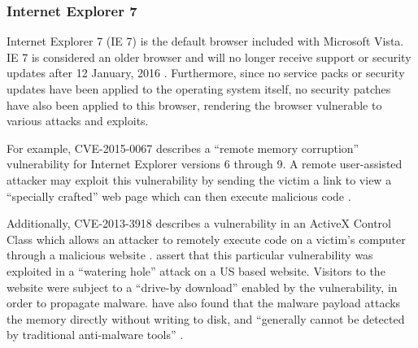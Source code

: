 
\subsubsection{Internet Explorer 7}

Internet Explorer 7 (IE 7) is the default browser included with Microsoft Vista. IE 7 is considered an older browser and will no longer receive support or security updates after 12 January, 2016 \citep{Capriotti2014}. Furthermore, since no service packs or security updates have been applied to the operating system itself, no security patches have also been applied to this browser, rendering the browser vulnerable to various attacks and exploits.

For example, CVE-2015-0067 describes a ``remote memory corruption'' vulnerability for Internet Explorer versions 6 through 9. A remote user-assisted attacker may exploit this vulnerability by sending the victim a link to view a ``specially crafted'' web page which can then execute malicious code \citep{SecurityFocus2015}.

Additionally, CVE-2013-3918 describes a vulnerability in an ActiveX Control Class which allows an attacker to remotely execute code on a victim's computer through a malicious website \citep{Ozkan2013, Microsoft2013}. \citet{Chen2013} assert that this particular vulnerability was exploited in a ``watering hole'' attack on a US based website. Visitors to the website were subject to a ``drive-by download'' enabled by the vulnerability, in order to propagate malware. \citet{Moran2013} have also found that the malware payload attacks the memory directly without writing to disk, and ``generally cannot be detected by traditional anti-malware tools'' \citep{Wilson2013}.


